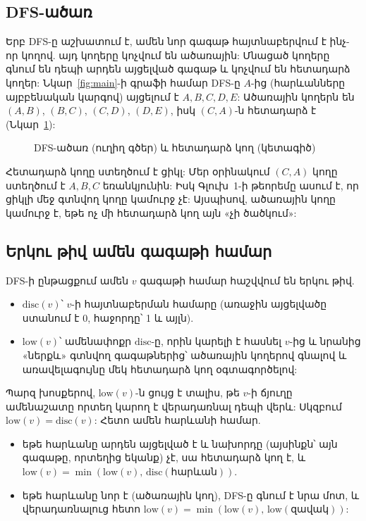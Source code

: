 \subsection{DFS-ածառ}

Երբ DFS-ը աշխատում է, ամեն նոր գագաթ հայտնաբերվում է ինչ-որ կողով. այդ կողերը կոչվում են ածառային: Մնացած կողերը գնում են դեպի արդեն այցելված գագաթ և կոչվում են հետադարձ կողեր: Նկար~\ref{fig:main}-ի գրաֆի համար DFS-ը $A$-ից (հարևանները այբբենական կարգով) այցելում է $A,B,C,D,E$: Ածառային կողերն են $(A,B)$, $(B,C)$, $(C,D)$, $(D,E)$, իսկ $(C,A)$-ն հետադարձ է (Նկար~\ref{fig:tree}):

\begin{figure}[h]
\centering
{}
\caption{DFS-ածառ (ուղիղ գծեր) և հետադարձ կող (կետագիծ)}\label{fig:tree}
\end{figure}

Հետադարձ կողը ստեղծում է ցիկլ: Մեր օրինակում $(C,A)$ կողը ստեղծում է $A,B,C$ եռանկյունին: Իսկ Գլուխ~1-ի թեորեմը ասում է, որ ցիկլի մեջ գտնվող կողը կամուրջ չէ: Այսպիսով, ածառային կողը կամուրջ է, եթե ոչ մի հետադարձ կող այն «չի ծածկում»:

\subsection{Երկու թիվ ամեն գագաթի համար}

DFS-ի ընթացքում ամեն $v$ գագաթի համար հաշվվում են երկու թիվ.
\begin{itemize}
  \item $\mathrm{disc}(v)$՝ $v$-ի հայտնաբերման համարը (առաջին այցելվածը ստանում է 0, հաջորդը՝ 1 և այլն).
  \item $\mathrm{low}(v)$՝ ամենափոքր $\mathrm{disc}$-ը, որին կարելի է հասնել $v$-ից և նրանից «ներքև» գտնվող գագաթներից՝ ածառային կողերով գնալով և առավելագույնը մեկ հետադարձ կող օգտագործելով:
\end{itemize}

Պարզ խոսքերով, $\mathrm{low}(v)$-ն ցույց է տալիս, թե $v$-ի ճյուղը ամենաշատը որտեղ կարող է վերադառնալ դեպի վերև: Սկզբում $\mathrm{low}(v)=\mathrm{disc}(v)$: Հետո ամեն հարևանի համար.
\begin{itemize}
  \item եթե հարևանը արդեն այցելված է և նախորդը (այսինքն՝ այն գագաթը, որտեղից եկանք) չէ, սա հետադարձ կող է, և $\mathrm{low}(v)=\min(\mathrm{low}(v),\,\mathrm{disc}(\text{հարևան}))$.
  \item եթե հարևանը նոր է (ածառային կող), DFS-ը գնում է նրա մոտ, և վերադառնալուց հետո $\mathrm{low}(v)=\min(\mathrm{low}(v),\,\mathrm{low}(\text{զավակ}))$:
\end{itemize}

